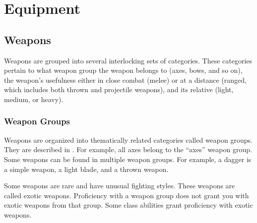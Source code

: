\chapter{Equipment}

\section{Weapons}\label{Weapons}

    Weapons are grouped into several interlocking sets of categories. These categories pertain to what weapon group the weapon belongs to (axes, bows, and so on), the weapon's usefulness either in close combat (melee) or at a distance (ranged, which includes both thrown and projectile weapons), and its relative  (light, medium, or heavy).

    \subsection{Weapon Groups}\label{Weapon Groups}

        Weapons are organized into thematically related categories called weapon groups. They are described in . For example, all axes belong to the ``axes'' weapon group. Some weapons can be found in multiple weapon groups. For example, a dagger is a simple weapon, a light blade, and a thrown weapon.

        \label{Exotic Weapons} Some weapons are rare and have unusual fighting styles.
        These weapons are called exotic weapons.
        Proficiency with a weapon group does not grant you with exotic weapons from that group.
        Some class abilities grant proficiency with exotic weapons.

